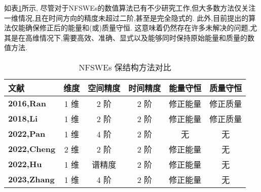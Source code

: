 如表\ref{tab:NFSWEs}所示, 尽管对于NFSWEs的数值算法已有不少研究工作,但大多数方法仅关注一维情况,且在时间方向的精度未超过二阶,甚至是完全隐式的.
此外,目前提出的算法仅能确保修正后的能量和(或)质量守恒.
这意味着仍然存在许多未解决的问题,尤其是在高维情况下,需要高效、准确、显式以及能够同时保持原始能量和质量的数值方法.
\begin{table}[htbp]
    \centering
    \small
    \caption{NFSWEs 保结构方法对比}
        \begin{tabular}{lccccc}
        \toprule
        \textcolor[rgb]{0,0,0}{\textbf{文献}} & \textcolor[rgb]{0,0,0}{\textbf{维度}} & \textcolor[rgb]{0,0,0}{\textbf{空间精度}} & \textcolor[rgb]{0,0,0}{\textbf{时间精度}} & \textcolor[rgb]{0,0,0}{\textbf{能量守恒}} & \textcolor[rgb]{0,0,0}{\textbf{质量守恒}} \\
        \midrule
        \textcolor[rgb]{0,0,0}{\textbf{\cite{ranLinearlyImplicitConservative2016}{2016,Ran}}} & 1 维   & 2 阶   & 2 阶   & 修正能量  & 修正质量 \\
        \midrule
        \textcolor[rgb]{0,0,0}{\textbf{\cite{liFastEnergyConserving2018}{2018,Li}}} & 1 维   & 2 阶   & 2 阶   & 修正能量  & 修正质量 \\
        \midrule
        \textcolor[rgb]{0,0,0}{\textbf{\cite{panFourthorderDifferenceScheme2022}{2022,Pan}}} & 1 维   & 4 阶   & 2 阶   & 无     & 无 \\
        \midrule
        \textcolor[rgb]{0,0,0}{\textbf{\cite{chengConvergenceEnergyconservingScheme2022}{2022,Cheng}}} & 2 维   & 2 阶   & 2 阶   & 修正能量  & 无 \\
        \midrule
        \textcolor[rgb]{0,0,0}{\textbf{\cite{huEfficientEnergyPreserving2022}{2022,Hu}}} & 1 维   & 谱精度   & 2 阶   & 修正能量  & 无 \\
        \midrule
        \textcolor[rgb]{0,0,0}{\textbf{\cite{zhangHighorderStructurepreservingDifference2023}{2023,Zhang}}} & 1 维   & 4 阶   & 2 阶   & 修正能量  & 无 \\
        \bottomrule
        \end{tabular}%
    \label{tab:NFSWEs}%
    \end{table}%
